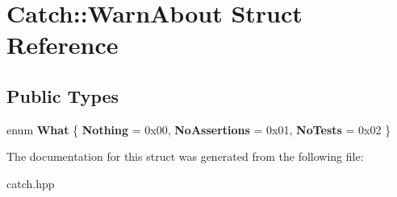 \hypertarget{structCatch_1_1WarnAbout}{}\section{Catch\+::Warn\+About Struct Reference}
\label{structCatch_1_1WarnAbout}
\subsection*{Public Types}
\begin{DoxyCompactItemize}
\item 
\mbox{\label{structCatch_1_1WarnAbout_ae3dde70ef78d700ea896eb29314e0fa3}} 
enum {\bfseries What} \{ {\bfseries Nothing} = 0x00, 
{\bfseries No\+Assertions} = 0x01, 
{\bfseries No\+Tests} = 0x02
 \}
\end{DoxyCompactItemize}


The documentation for this struct was generated from the following file\+:\begin{DoxyCompactItemize}
\item 
catch.\+hpp\end{DoxyCompactItemize}
